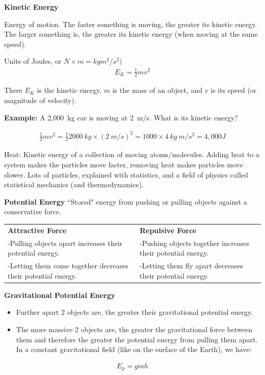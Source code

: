 \documentclass[12pt]{article}
\begin{document}
\textbf{Kinetic Energy}

Energy of motion. The faster something is moving, the greater its kinetic energy. The larger something is, the greater its kinetic energy (when moving at the same speed).

Units of Joules, or $N\times m = kg m^2/s^2)$
\begin{eqnarray}
E_K = \frac{1}{2}mv^2 \nonumber
\end{eqnarray}

There $E_K$ is the kinetic energy, $m$ is the mass of an object, and $v$ is its speed (or magnitude of velocity).

\noindent \textbf{Example:} A 2,000~kg car is moving at 2~m/s. What is its kinetic energy?

\begin{eqnarray}
\frac{1}{2}mv^2 = \frac{1}{2}2000~kg\times\left(2~m/s\right)^2 = 1000\times 4~kg~m/s^2 = 4,000 J
\end{eqnarray}

Heat: Kinetic energy of a collection of moving atoms/molecules. Adding heat to a system makes the particles move faster, removing heat makes particles move slower. Lots of particles, explained with statistics, and a field of physics called statistical mechanics (and thermodynamics).

\textbf{Potential Energy}
``Stored" energy from pushing or pulling objects against a conservative force.

\begin{table}[h!]
     \begin{center}
     \begin{tabularx}{\textwidth}{ |X | X }
      \textbf{Attractive Force} & \textbf{Repulsive Force}
      \\
      -Pulling objects apart increases their potential energy. & -Pushing objects together increases their potential energy. \\
      -Letting them come together decreases their potential energy. & -Letting them fly apart decreases their potential energy.
      \end{tabularx}
      \end{center}
\end{table}

\textbf{Gravitational Potential Energy}

\begin{itemize}
	\item Further apart 2 objects are, the greater their gravitational potential energy.
	\item The more massive 2 objects are, the greater the gravitational force between them and therefore the greater the potential energy from pulling them apart. In a constant gravitational field (like on the surface of the Earth), we have:
\end{itemize}
\begin{eqnarray}
	E_p = g m h \nonumber
\end{eqnarray}
\end{document}
